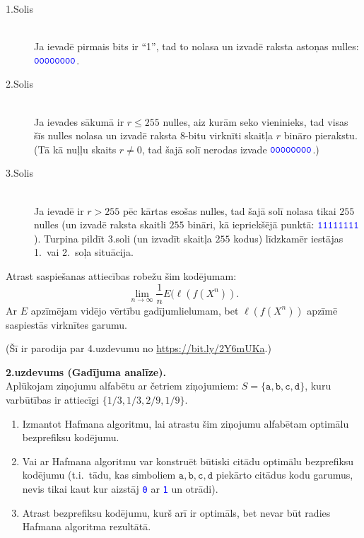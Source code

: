 \documentclass[a4paper,12pt]{article}
\begin{document}
\begin{description}
\item[1.Solis] \hfill \\
Ja ievadē pirmais bits ir ``1'', tad to nolasa un
izvadē raksta astoņas nulles:
$\textcolor{blue}{\mathtt{00000000}}$.
\item[2.Solis] \hfill \\
Ja ievades sākumā ir $r \leq 255$ nulles, aiz kurām seko vieninieks,
tad visas šīs nulles nolasa un
izvadē raksta $8$-bitu virknīti \textendash{} skaitļa $r$ bināro pierakstu.
(Tā kā nuļļu skaits $r \neq 0$, tad šajā solī nerodas izvade $\textcolor{blue}{\mathtt{00000000}}$.)
\item[3.Solis] \hfill \\
Ja ievadē ir $r > 255$ pēc kārtas esošas nulles,
tad šajā solī nolasa tikai $255$ nulles (un izvadē raksta skaitli $255$ bināri, kā iepriekšējā punktā:
$\textcolor{blue}{\mathtt{11111111}}$). Turpina pildīt 3.soli (un izvadīt skaitļa
$255$ kodus) līdzkamēr iestājas 1.\ vai 2.\ soļa situācija.
\end{description}

Atrast saspiešanas attiecības robežu šim kodējumam:
\begin{equation}
\label{eq1}
\lim_{n \rightarrow \infty} \frac{1}{n} E(\ell(f(X^n)).
\end{equation}
Ar $E$ apzīmējam vidējo vērtību gadījumlielumam, bet
$\ell(f(X^n))$ apzīmē saspiestās virknītes garumu.


(Šī ir parodija par 4.uzdevumu no \url{https://bit.ly/2Y6mUKa}.)


\vspace{10pt}
{\bf 2.uzdevums (Gadījuma analīze).}\\
Aplūkojam ziņojumu alfabētu ar četriem ziņojumiem:
$S = \{ \mathtt{a}, \mathtt{b}, \mathtt{c}, \mathtt{d} \}$,
kuru varbūtības ir attiecīgi $\{1/3, 1/3, 2/9, 1/9\}$.

\begin{enumerate}
\item Izmantot Hafmana algoritmu, lai atrastu šim ziņojumu alfabētam optimālu bezprefiksu ko\-dē\-ju\-mu.
\item Vai ar Hafmana algoritmu var konstruēt bū\-tis\-ki citādu optimālu bezprefiksu kodējumu
(t.i.\ tādu, kas simboliem $\mathtt{a}, \mathtt{b}, \mathtt{c}, \mathtt{d}$
piekārto citādus kodu garumus, nevis tikai kaut kur aizstāj
\textcolor{blue}{\tt 0} ar \textcolor{blue}{\tt 1} un otrādi).
\item Atrast bezprefiksu kodējumu, kurš arī ir optimāls, bet nevar būt radies Hafmana algoritma rezultātā.
\end{enumerate}
\end{document}

